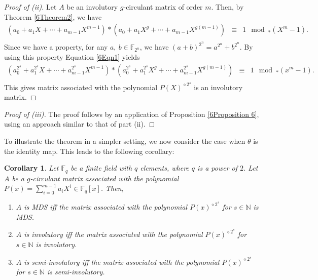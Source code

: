 \documentclass[12pt]{article}
\newtheorem{corollary}{Corollary}
\begin{document}
	\begin{proof}[Proof of (ii)]
	Let $A$ be an involutory $g$-circulant matrix of order $m$. Then, by Theorem \ref{6Theorem2}, we have 
	\begin{eqnarray}\label{6Eqn1}
		(a_0+a_1X+\cdots+a_{m-1}X^{m-1})\ast (a_0+a_1X^g+\cdots+a_{m-1}X^{g(m-1)})\nonumber&\equiv& 1 \mod_\ast (X^m-1). \\
		&~&
	\end{eqnarray}	
	Since we have a property, for any $a, ~b\in \mathbb{F}_{2^n}$, we have $(a+b)^{2^n}=a^{2^n}+b^{2^n}$. By using this property Equation \ref{6Eqn1} yields
	\begin{eqnarray}
		(a^{2^s}_0+a^{2^s}_1X+\cdots+a^{2^s}_{m-1}X^{m-1})\ast (a^{2^s}_0+a^{2^s}_1X^g+\cdots+a^{2^s}_{m-1}X^{g(m-1)})\nonumber&\equiv& 1 \mod_\ast (x^m-1).\\
		&~& 
	\end{eqnarray}
	This gives matrix associated with the polynomial $P(X )^{{\diamond} 2^s}$ is an involutory matrix.
	\end{proof}
	\begin{proof}[Proof of (iii)]
	The proof follows by an application of Proposition \ref{6Proposition 6}, using an approach similar to that of part (ii).
	
	\end{proof}
To illustrate the theorem in a simpler setting, we now consider the case when $\theta$ is the identity map. This leads to the following corollary:
	
	\begin{corollary}
	Let $\mathbb{F}_q$ be a finite field with $q$ elements, where $q$ is a power of $2$. Let $A$ be a $g$-circulant matrix associated with the polynomial $P(x) = \sum_{i=0}^{m-1} a_i X^i \in \mathbb{F}_q[x]$. Then,
		\begin{enumerate}
			\item[(i)] $A$ is MDS \textup{iff} the matrix associated with the polynomial $P(x)^{\diamond 2^s}$ for $s \in \mathbb{N}$ is MDS.
			\item[(ii)] $A$ is involutory \textup{iff} the matrix associated with the polynomial $P(x)^{\diamond 2^s}$ for $s \in \mathbb{N}$ is involutory.
			\item[(iii)] $A$ is semi-involutory \textup{iff} the matrix associated with the polynomial $P(x)^{\diamond 2^s}$ for $s \in \mathbb{N}$ is semi-involutory.
		\end{enumerate}
	\end{corollary}
\end{document}
